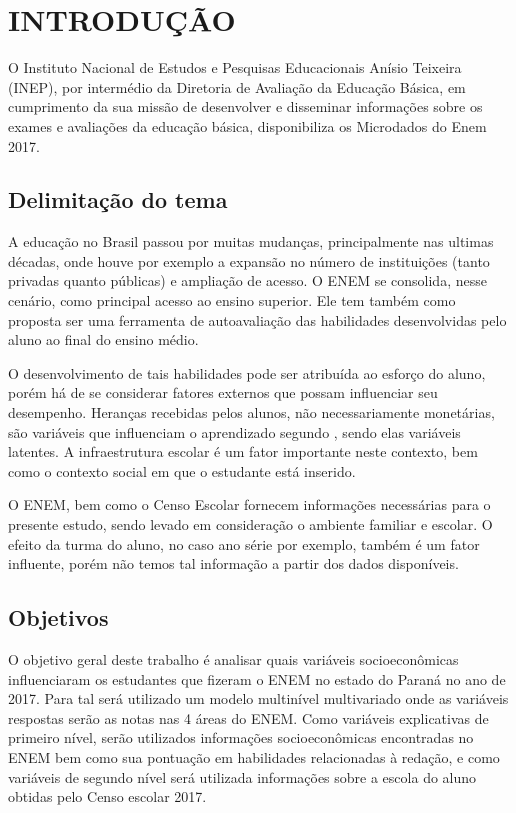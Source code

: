 \chapter[INTRODUÇÃO]{INTRODUÇÃO}   %

O Instituto Nacional de Estudos e Pesquisas Educacionais Anísio Teixeira (INEP), por intermédio da Diretoria de Avaliação da Educação Básica, em cumprimento da sua missão de desenvolver e disseminar informações sobre os exames e avaliações da educação básica, disponibiliza os Microdados do Enem 2017.

\section{Delimitação do tema}

A educação no Brasil passou por muitas mudanças, principalmente nas ultimas décadas, onde houve por exemplo a expansão no número de instituições (tanto privadas quanto públicas) e ampliação de acesso. O ENEM se consolida, nesse cenário, como principal acesso ao ensino superior. Ele tem também como proposta ser uma ferramenta de autoavaliação das habilidades desenvolvidas pelo aluno ao final do ensino médio. 

O desenvolvimento de tais habilidades pode ser atribuída ao esforço do aluno, porém há de se considerar fatores externos que possam influenciar seu desempenho. Heranças recebidas pelos alunos, não necessariamente monetárias, são variáveis que influenciam o aprendizado segundo \cite{bourdieu1986forms} , sendo elas variáveis latentes. A infraestrutura escolar é um fator importante neste contexto, bem como o contexto social em que o estudante está inserido.

O ENEM, bem como o Censo Escolar fornecem informações necessárias para o presente estudo, sendo levado em consideração o ambiente familiar e escolar. O efeito da turma do aluno, no caso ano série por exemplo, também é um fator influente, porém não temos tal informação a partir dos dados disponíveis.

\section{Objetivos}

O objetivo geral deste trabalho é analisar quais variáveis socioeconômicas influenciaram os estudantes que fizeram o ENEM no estado do Paraná no ano de 2017. Para tal será utilizado um modelo multinível multivariado onde as variáveis respostas serão as notas nas 4 áreas do ENEM. Como variáveis explicativas de primeiro nível, serão utilizados informações socioeconômicas encontradas no ENEM bem como sua pontuação em habilidades relacionadas à redação, e como variáveis de segundo nível será utilizada informações sobre a escola do aluno obtidas pelo Censo escolar 2017.
